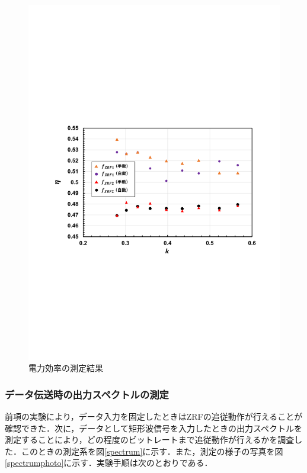 \begin{figure}[p]
\begin{center}
\includegraphics[width=140mm]{figures/tracking2.pdf}
\caption{電力効率の測定結果}
\label{tracking2}

\end{center}
\end{figure}

\subsubsection{データ伝送時の出力スペクトルの測定}
前項の実験により，データ入力を固定したときはZRFの追従動作が行えることが確認できた．次に，データとして矩形波信号を入力したときの出力スペクトルを測定することにより，どの程度のビットレートまで追従動作が行えるかを調査した．このときの測定系を図\ref{spectrum}に示す．また，測定の様子の写真を図\ref{spectrumphoto}に示す．実験手順は次のとおりである．

